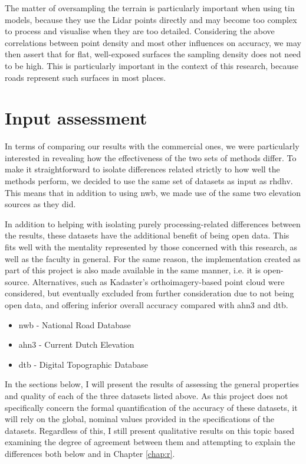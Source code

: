 The matter of oversampling the terrain is particularly important when using \ac{tin} models, because they use the Lidar points directly and may become too complex to process and visualise when they are too detailed. Considering the above correlations between point density and most other influences on accuracy, we may then assert that for flat, well-exposed surfaces the sampling density does not need to be high. This is particularly important in the context of this research, because roads represent such surfaces in most places.

\section{Input assessment}
\label{sec:input}

In terms of comparing our results with the commercial ones, we were particularly interested in revealing how the effectiveness of the two sets of methods differ. To make it straightforward to isolate differences related strictly to how well the methods perform, we decided to use the same set of datasets as input as \ac{rhdhv}. This means that in addition to using \ac{nwb}, we made use of the same two elevation sources as they did.

In addition to helping with isolating purely processing-related differences between the results, these datasets have the additional benefit of being open data. This fits well with the mentality represented by those concerned with this research, as well as the faculty in general. For the same reason, the implementation created as part of this project is also made available in the same manner, i.e. it is open-source. Alternatives, such as Kadaster's orthoimagery-based point cloud were considered, but eventually excluded from further consideration due to not being open data, and offering inferior overall accuracy compared with \ac{ahn3} and \ac{dtb}.

\begin{itemize}
    \item \ac{nwb} - National Road Database
    \item \ac{ahn3} - Current Dutch Elevation
    \item \ac{dtb} - Digital Topographic Database
\end{itemize}

In the sections below, I will present the results of assessing the general properties and quality of each of the three datasets listed above. As this project does not specifically concern the formal quantification of the accuracy of these datasets, it will rely on the global, nominal values provided in the specifications of the datasets. Regardless of this, I still present qualitative results on this topic based examining the degree of agreement between them and attempting to explain the differences both below and in Chapter \ref{chap:r}.

